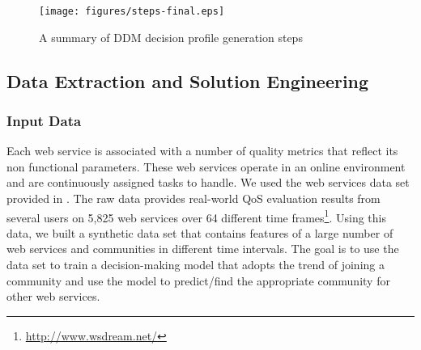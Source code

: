 \documentclass[11pt,onecolumn]{IEEEtran}
\begin{document}
\begin{figure}%
\centerline{\texttt{[image: figures/steps-final.eps]}}
\caption{A summary of DDM decision profile generation steps}
\label{fig_steps}
\end{figure}

\subsection{Data Extraction and Solution Engineering}\label{ss:learningdata}

\subsubsection{Input Data}\label{sss:webservices}

Each web service is associated with a number of quality metrics that reflect its non functional parameters. These web services operate in an online environment and are continuously assigned tasks to handle. %
We used the web services data set provided in \cite{10.1109/ISSRE.2011.17}. The raw data provides real-world QoS evaluation results from several users on 5,825 web services over 64 different time frames\footnote{\url{http://www.wsdream.net/}}. %
Using this data, we built a synthetic data set that contains features of a large number of web services and communities in different time intervals. The goal is to use the data set to train a decision-making model that adopts the trend of joining a community and use the model to predict/find the appropriate community for other web services. %
\end{document}
